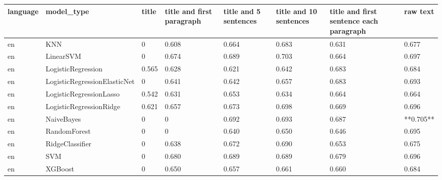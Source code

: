 \begin{tabular}{llllllll}
\toprule
language &                   model\_type & title & title and first paragraph & title and 5 sentences & title and 10 sentences & title and first sentence each paragraph &  raw text \\
\midrule
      en &                          KNN &     0 &                     0.608 &                 0.664 &                  0.683 &                                   0.631 &     0.677 \\
      en &                    LinearSVM &     0 &                     0.674 &                 0.689 &                  0.703 &                                   0.664 &     0.697 \\
      en &           LogisticRegression & 0.565 &                     0.628 &                 0.621 &                  0.642 &                                   0.683 &     0.684 \\
      en & LogisticRegressionElasticNet &     0 &                     0.641 &                 0.642 &                  0.657 &                                   0.683 &     0.693 \\
      en &      LogisticRegressionLasso & 0.542 &                     0.631 &                 0.653 &                  0.634 &                                   0.664 &     0.664 \\
      en &      LogisticRegressionRidge & 0.621 &                     0.657 &                 0.673 &                  0.698 &                                   0.669 &     0.696 \\
      en &                   NaiveBayes &     0 &                         0 &                 0.692 &                  0.693 &                                   0.687 & **0.705** \\
      en &                 RandomForest &     0 &                         0 &                 0.640 &                  0.650 &                                   0.646 &     0.695 \\
      en &              RidgeClassifier &     0 &                     0.638 &                 0.672 &                  0.690 &                                   0.653 &     0.675 \\
      en &                          SVM &     0 &                     0.680 &                 0.689 &                  0.689 &                                   0.679 &     0.696 \\
      en &                      XGBoost &     0 &                     0.650 &                 0.657 &                  0.661 &                                   0.660 &     0.684 \\

\end{tabular}
